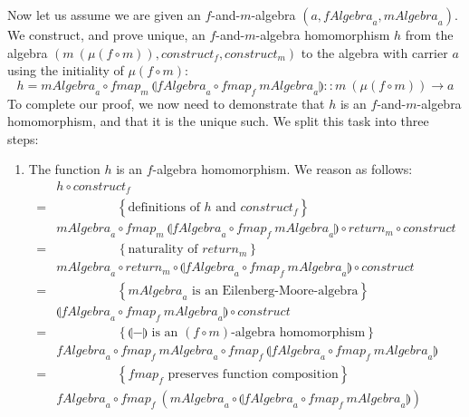 \documentclass{jfp1}
\newcommand{\fold}[1]{\llparenthesis #1 \rrparenthesis}
\newcommand{\eqAnnotation}[1]{\hspace{2cm}\left\{\textrm{#1}\right\}}
\begin{document}
\begin{proof*}
  Now let us assume we are given an $f$-and-$m$-algebra $(a,
  \mathit{fAlgebra}_a, \mathit{mAlgebra}_a)$. We construct, and prove
  unique, an $f$-and-$m$-algebra homomorphism $h$ from the algebra
  $(m~(\mu(f \circ m)), \mathit{construct}_f, \mathit{construct}_m)$
  to the algebra with carrier $a$ using the initiality of $\mu(f \circ
  m)$:
  \begin{displaymath}
    h = \mathit{mAlgebra}_a \circ \mathit{fmap}_m~\fold{\mathit{fAlgebra}_a \circ \mathit{fmap}_f~\mathit{mAlgebra}_a} :: m~(\mu(f \circ m)) \to a
  \end{displaymath}
  To complete our proof, we now need to demonstrate that $h$ is an
  $f$-and-$m$-algebra homomorphism, and that it is the unique such. We
  split this task into three steps:
  \begin{enumerate}
  \item The function $h$ is an $f$-algebra homomorphism. We reason as
    follows:
    \begin{displaymath}
      \begin{array}{cl}
        & h \circ \mathit{construct}_f \\
        =&\eqAnnotation{definitions of $h$ and $\mathit{construct_f}$} \\
         &\mathit{mAlgebra}_a \circ \mathit{fmap}_m~\fold{\mathit{fAlgebra}_a \circ \mathit{fmap}_f~\mathit{mAlgebra}_a} \circ \mathit{return}_m \circ \mathit{construct} \\
        =&\eqAnnotation{naturality of $\mathit{return}_m$} \\
         &\mathit{mAlgebra}_a \circ \mathit{return}_m \circ \fold{\mathit{fAlgebra}_a \circ \mathit{fmap}_f~\mathit{mAlgebra}_a} \circ \mathit{construct} \\
        =&\eqAnnotation{$\mathit{mAlgebra}_a$ is an Eilenberg-Moore-algebra} \\
         &\fold{\mathit{fAlgebra}_a \circ \mathit{fmap}_f~\mathit{mAlgebra}_a} \circ \mathit{construct} \\
        =&\eqAnnotation{$\fold{-}$ is an $(f \circ m)$-algebra homomorphism} \\
         &\mathit{fAlgebra}_a \circ \mathit{fmap}_f~\mathit{mAlgebra}_a \circ \mathit{fmap}_f~\fold{\mathit{fAlgebra}_a \circ \mathit{fmap}_f~\mathit{mAlgebra}_a} \\
        =&\eqAnnotation{$\mathit{fmap}_f$ preserves function composition} \\
         &\mathit{fAlgebra}_a \circ \mathit{fmap}_f~(\mathit{mAlgebra}_a \circ \fold{\mathit{fAlgebra}_a \circ \mathit{fmap}_f~\mathit{mAlgebra}_a}) \\

\end{array}
\end{displaymath}
\end{enumerate}
\end{proof*}
\end{document}

